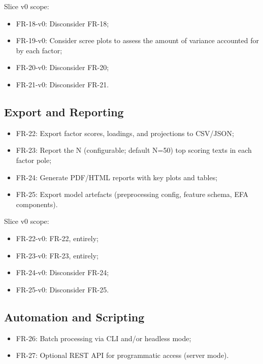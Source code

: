 Slice v0 scope:

\begin{itemize}
    \item FR-18-v0: Disconsider FR-18;
    \item FR-19-v0: Consider scree plots to assess the amount of variance accounted for by each factor;
    \item FR-20-v0: Disconsider FR-20;
    \item FR-21-v0: Disconsider FR-21.
\end{itemize}

\subsection{Export and Reporting}

\begin{itemize}
    \item FR-22: Export factor scores, loadings, and projections to CSV/JSON;
    \item FR-23: Report the N (configurable; default N=50) top scoring texts in each factor pole;
    \item FR-24: Generate PDF/HTML reports with key plots and tables;
    \item FR-25: Export model artefacts (preprocessing config, feature schema, EFA components).
\end{itemize}

Slice v0 scope:

\begin{itemize}
    \item FR-22-v0: FR-22, entirely;
    \item FR-23-v0: FR-23, entirely;
    \item FR-24-v0: Disconsider FR-24;
    \item FR-25-v0: Disconsider FR-25.
\end{itemize}

\subsection{Automation and Scripting}

\begin{itemize}
    \item FR-26: Batch processing via CLI and/or headless mode;
    \item FR-27: Optional REST API for programmatic access (server mode).
\end{itemize}

